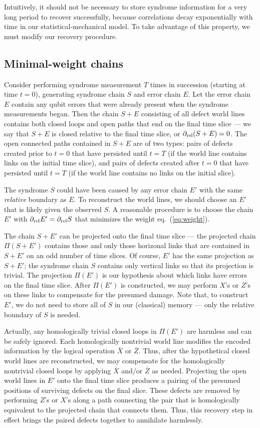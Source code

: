 Intuitively, it should not be necessary to store syndrome information for a very long period to recover successfully, because correlations decay exponentially with time in our statistical-mechanical model. To take advantage of this property, we must modify our recovery procedure.

\subsection{Minimal-weight chains}
Consider performing syndrome measurement $T$ times in succession (starting at time $t=0$), generating syndrome chain $S$ and error chain $E$. Let the error chain $E$ contain any qubit errors that were already present when the syndrome measurements began. Then the chain $S+E$ consisting of all defect world lines contains both closed loops and open paths that end on the final time slice --- we say that $S+E$ is closed relative to the final time slice, or $\partial_{\rm rel}(S+E)=0$. The open connected paths contained in $S+E$ are of two types: pairs of defects created prior to $t=0$ that have persisted until $t=T$ (if the world line contains links on the initial time slice), and pairs of defects created after $t=0$ that have persisted until $t=T$ (if the world line contains no links on the initial slice).

The syndrome $S$ could have been caused by any error chain $E'$ with the same {\em relative} boundary as $E$. To reconstruct the world lines, we should choose an $E'$ that is likely given the observed $S$. A reasonable procedure is to choose the chain $E'$ with $\partial_{\rm rel}E'=\partial_{\rm rel} S$ that minimizes the weight eq.~(\ref{eq:weight}).

The chain $S+E'$ can be projected onto the final time slice --- the projected chain $\Pi(S+E')$ contains those and only those horizonal links that are contained in $S+E'$ on an odd number of time slices. Of course, $E'$ has the same projection as $S+E'$; the syndrome chain $S$ contains only vertical links so that its projection is trivial. The projection $\Pi(E')$ is our hypothesis about which links have errors on the final time slice. After $\Pi(E')$ is constructed, we may perform $X$'s or $Z$'s on these links to compensate for the presumed damage. Note that, to construct $E'$, we do not need to store all of $S$ in our (classical) memory --- only the relative boundary of $S$ is needed.

Actually, any homologically trivial closed loops in $\Pi(E')$ are harmless and can be safely ignored.  Each homologically nontrivial world line modifies the encoded information by the
logical operation $\bar X$ or $\bar Z$.  Thus, after the hypothetical closed
world lines are reconstructed, we may compensate for the homologically
nontrivial closed loops by applying $\bar X$ and/or $\bar Z$ as needed.
Projecting the open world lines in $E'$ onto the final time slice
produces a pairing of the presumed positions of surviving defects on the final
slice.  These defects are removed by performing $Z$'s or $X$'s along a path
connecting the pair that is homologically equivalent to the projected chain
that connects them.  Thus, this recovery step in effect brings the paired
defects together to annihilate harmlessly.


